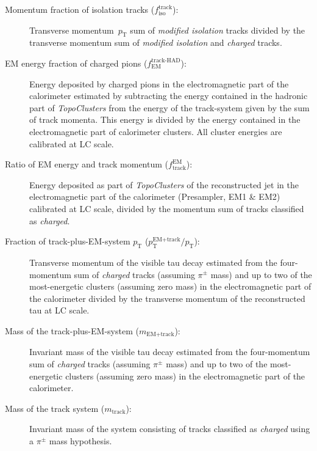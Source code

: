 \begin{description}
\item[Momentum fraction of isolation tracks ($f_\text{iso}^\text{track}$):]
  Transverse momentum~$p_\text{T}$ sum of \emph{modified isolation} tracks
  divided by the transverse momentum sum of \emph{modified isolation} and
  \emph{charged} tracks.

\item[EM energy fraction of charged pions ($f_\text{EM}^\text{track-HAD}$):]
  Energy deposited by charged pions in the electromagnetic part of the
  calorimeter estimated by subtracting the energy contained in the hadronic part
  of \emph{TopoClusters} from the energy of the track-system given by the sum of
  track momenta. This energy is divided by the energy contained in the
  electromagnetic part of calorimeter clusters. All cluster energies are
  calibrated at LC scale.

\item[Ratio of EM energy and track momentum ($f_\text{track}^\text{EM}$):]
  Energy deposited as part of \emph{TopoClusters} of the reconstructed jet in
  the electromagnetic part of the calorimeter (Presampler, EM1 \& EM2)
  calibrated at LC scale, divided by the momentum sum of tracks classified as
  \emph{charged}.

\item[Fraction of track-plus-EM-system $p_\text{T}$
  ($p_\text{T}^\text{EM+track} / p_\text{T}$):] Transverse momentum of the
  visible tau decay estimated from the four-momentum sum of \emph{charged}
  tracks (assuming $\pi^\pm$ mass) and up to two of the most-energetic clusters
  (assuming zero mass) in the electromagnetic part of the calorimeter divided by
  the transverse momentum of the reconstructed tau at LC scale.

\item[Mass of the track-plus-EM-system ($m_\text{EM+track}$):] Invariant mass of
  the visible tau decay estimated from the four-momentum sum of \emph{charged}
  tracks (assuming $\pi^\pm$ mass) and up to two of the most-energetic clusters
  (assuming zero mass) in the electromagnetic part of the calorimeter.

\item[Mass of the track system ($m_\text{track}$):] Invariant mass of the system
  consisting of tracks classified as \emph{charged} using a $\pi^\pm$ mass
  hypothesis.
\end{description}
